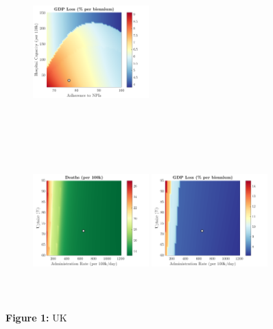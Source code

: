 \documentclass[paper=a4, fontsize=11pt]{scrartcl}
\numberwithin{figure}{section}
\numberwithin{table}{section}
\begin{document}
\begin{figure}[H]
\begin{subfigure}[b]{\textwidth}
	\hspace{0.05cm}
    	\includegraphics[width=0.49\textwidth,height=6cm]{UK/SARS/npl_g}
    \end{subfigure}
    \begin{subfigure}[b]{\textwidth}
      	\includegraphics[width=0.49\textwidth,height=6cm]{UK/SARS/imm_d}
	\hspace{0.05cm}
    	\includegraphics[width=0.49\textwidth,height=6cm]{UK/SARS/imm_g}
    \end{subfigure}
\caption*{\textbf{Figure 1:} UK} 
\end{figure}
\end{document}
